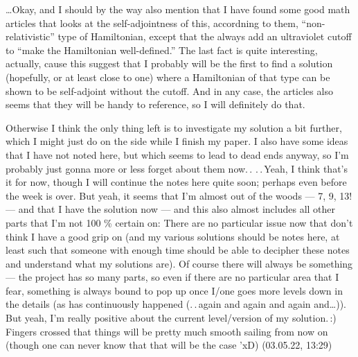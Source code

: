\documentclass{report}
\begin{document}
\ldots Okay, and I should by the way also mention that I have found some good math articles that looks at the self-adjointness of this, accordning to them, ``non-relativistic'' type of Hamiltonian, except that the always add an ultraviolet cutoff to ``make the Hamiltonian well-defined.'' The last fact is quite interesting, actually, cause this suggest that I probably will be the first to find a solution (hopefully, or at least close to one) where a Hamiltonian of that type can be shown to be self-adjoint without the cutoff. And in any case, the articles also seems that they will be handy to reference, so I will definitely do that.

Otherwise I think the only thing left is to investigate my solution a bit further, which I might just do on the side while I finish my paper. I also have some ideas that I have not noted here, but which seems to lead to dead ends anyway, so I'm probably just gonna more or less forget about them now.\,. .\,.\,Yeah, I think that's it for now, though I will continue the notes here quite soon; perhaps even before the week is over. But yeah, it seems that I'm almost out of the woods --- 7, 9, 13! --- and that I have the solution now --- and this also almost includes all other parts that I'm not 100 \% certain on: There are no particular issue now that don't think I have a good grip on (and my various solutions should be notes here, at least such that someone with enough time should be able to decipher these notes and understand what my solutions are). Of course there will always be something --- the project has so many parts, so even if there are no particular area that I fear, something is always bound to pop up once I/one goes more levels down in the details (as has continuously happened (.\,.\,again and again and again and\ldots)). But yeah, I'm really positive about the current level/version of my solution.\,:) Fingers crossed that things will be pretty much smooth sailing from now on (though one can never know that that will be the case 'xD) (03.05.22, 13:29) 
\end{document}
